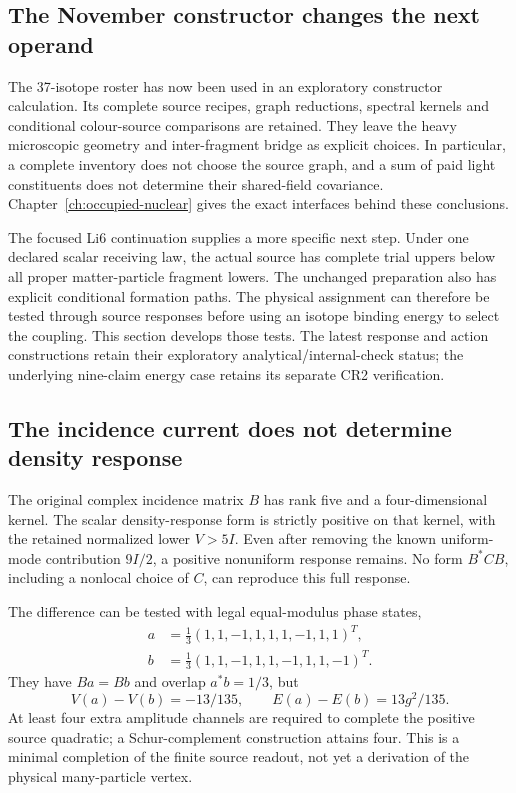 \subsection{The November constructor changes the next operand}
\label{sec:receiving-nov}

The 37-isotope roster has now been used in an exploratory constructor
calculation. Its complete source recipes, graph reductions, spectral
kernels and conditional colour-source comparisons are retained. They leave
the heavy microscopic geometry and inter-fragment bridge as explicit
choices. In particular, a complete inventory does not choose the source
graph, and a sum of paid light constituents does not determine their
shared-field covariance. Chapter~\ref{ch:occupied-nuclear} gives the exact
interfaces behind these conclusions.

The focused Li6 continuation supplies a more specific next step. Under one
declared scalar receiving law, the actual source has complete trial uppers
below all proper matter-particle fragment lowers. The unchanged preparation
also has explicit conditional formation paths. The physical assignment can
therefore be tested through source responses before using an isotope
binding energy to select the coupling. This section develops those tests.
The latest response and action constructions retain their exploratory
analytical/internal-check status; the underlying nine-claim energy case
retains its separate CR2 verification.

\subsection{The incidence current does not determine density response}

The original complex incidence matrix $B$ has rank five and a
four-dimensional kernel. The scalar density-response form is strictly
positive on that kernel, with the retained normalized lower $V>5I$.
Even after removing the known uniform-mode contribution $9I/2$, a positive
nonuniform response remains. No form $B^*CB$, including a nonlocal choice
of $C$, can reproduce this full response.

The difference can be tested with legal equal-modulus phase states,
\begin{align}
a&=\tfrac13(1,1,-1,1,1,1,-1,1,1)^T,\\
b&=\tfrac13(1,1,-1,1,1,-1,1,1,-1)^T.
\end{align}
They have $Ba=Bb$ and overlap $a^*b=1/3$, but
\begin{equation}
V(a)-V(b)=-13/135,\qquad E(a)-E(b)=13g^2/135.
\end{equation}
At least four extra amplitude channels are required to complete the
positive source quadratic; a Schur-complement construction attains four.
This is a minimal completion of the finite source readout, not yet a
derivation of the physical many-particle vertex.

